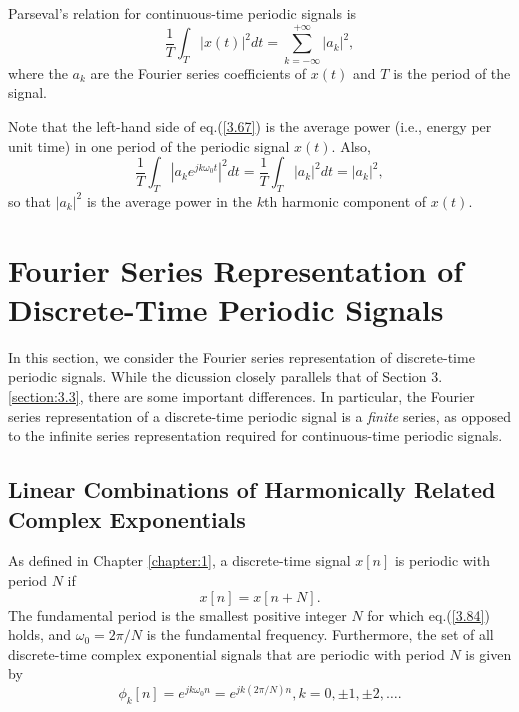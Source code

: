 \documentclass[a4paper,twoside]{book}
\begin{document}
Parseval's relation for continuous-time periodic signals is
\begin{equation}
    \frac1T\int_T|x(t)|^2dt=\sum_{k=-\infty}^{+\infty}|a_k|^2,
    \label{3.67}
\end{equation}
where the $a_k$ are the Fourier series coefficients of $x(t)$ and $T$ is the period of the signal.

Note that the left-hand side of eq.\;(\ref{3.67}) is the average power (i.e., energy per unit time) in one period of the periodic signal $x(t)$. Also,
\begin{equation}
    \frac1T\int_T\left|a_ke^{jk\omega_0t}\right|^2dt=\frac1T\int_T|a_k|^2dt=|a_k|^2,
    \label{3.68}
\end{equation}
so that $|a_k|^2$ is the average power in the $k$th harmonic component of $x(t)$.

\section{Fourier Series Representation of Discrete-Time Periodic Signals}

In this section, we consider the Fourier series representation of discrete-time periodic signals. While the dicussion closely parallels that of Section 3.\ref{section:3.3}, there are some important differences. In particular, the Fourier series representation of a discrete-time periodic signal is a \textit{finite} series, as opposed to the infinite series representation required for continuous-time periodic signals.

\subsection{Linear Combinations of Harmonically Related Complex Exponentials}

As defined in Chapter \ref{chapter:1}, a discrete-time signal $x[n]$ is periodic with period $N$ if
\begin{equation}
    x[n]=x[n+N].
    \label{3.84}
\end{equation}
The fundamental period is the smallest positive integer $N$ for which eq.\;(\ref{3.84}) holds, and $\omega_0=2\pi/N$ is the fundamental frequency. Furthermore, the set of all discrete-time complex exponential signals that are periodic with period $N$ is given by
\begin{equation}
    \phi_k[n] = e^{jk\omega_0n} = e^{jk(2\pi/N)n}, k = 0,\pm1,\pm2,\ldots.
    \label{3.85}
\end{equation}
\end{document}
